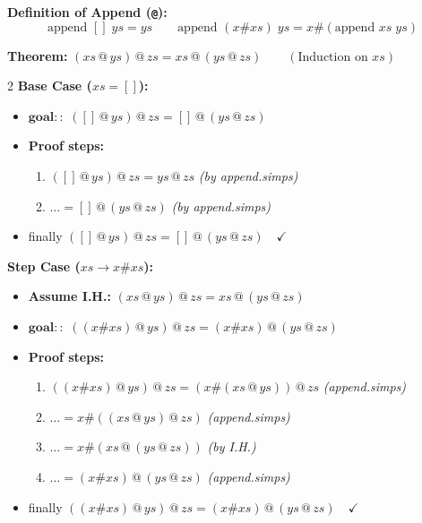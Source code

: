 \documentclass[10pt,a4paper]{article}
\begin{document}
\vspace{0.3em}

\begin{tcolorbox}[title=2. Worked Example: Associativity of List Append]
\textbf{Definition of Append (\texttt{@}):}
\[ \text{append } [] \; ys = ys \qquad \text{append } (x \# xs) \; ys = x \# (\text{append } xs \; ys) \]

\textbf{Theorem:} $(xs \mathbin{@} ys) \mathbin{@} zs = xs \mathbin{@} (ys \mathbin{@} zs) \qquad (\text{Induction on } xs)$

\begin{multicols}{2}
\textbf{Base Case ($xs = []$):}
\begin{itemize}[leftmargin=1.2em, itemsep=2pt]
    \item $\textbf{goal}::$ $([] \mathbin{@} ys) \mathbin{@} zs = [] \mathbin{@} (ys \mathbin{@} zs)$
    \item \textbf{Proof steps:}
    \begin{enumerate}[leftmargin=1.2em, itemsep=1pt]
        \item $([] \mathbin{@} ys) \mathbin{@} zs = ys \mathbin{@} zs$ \quad \textit{(by append.simps)}
        \item $\dots = [] \mathbin{@} (ys \mathbin{@} zs)$ \quad \textit{(by append.simps)}
    \end{enumerate}
    \item \textsf{finally} $([] \mathbin{@} ys) \mathbin{@} zs = [] \mathbin{@} (ys \mathbin{@} zs) \quad \checkmark$
\end{itemize}

\columnbreak

\textbf{Step Case ($xs \to x \# xs$):}
\begin{itemize}[leftmargin=1.2em, itemsep=2pt]
    \item \textbf{Assume I.H.:} $(xs \mathbin{@} ys) \mathbin{@} zs = xs \mathbin{@} (ys \mathbin{@} zs)$
    \item $\textbf{goal}::$ $((x \# xs) \mathbin{@} ys) \mathbin{@} zs = (x \# xs) \mathbin{@} (ys \mathbin{@} zs)$
    \item \textbf{Proof steps:}
    \begin{enumerate}[leftmargin=1.2em, itemsep=1pt]
        \item $((x \# xs) \mathbin{@} ys) \mathbin{@} zs = (x \# (xs \mathbin{@} ys)) \mathbin{@} zs$ \quad \textit{(append.simps)}
        \item $\dots = x \# ((xs \mathbin{@} ys) \mathbin{@} zs)$ \quad \textit{(append.simps)}
        \item $\dots = x \# (xs \mathbin{@} (ys \mathbin{@} zs))$ \quad \textit{(by I.H.)}
        \item $\dots = (x \# xs) \mathbin{@} (ys \mathbin{@} zs)$ \quad \textit{(append.simps)}
    \end{enumerate}
    \item \textsf{finally} $((x \# xs) \mathbin{@} ys) \mathbin{@} zs = (x \# xs) \mathbin{@} (ys \mathbin{@} zs) \quad \checkmark$
\end{itemize}
\end{multicols}
\end{tcolorbox}
\end{document}
